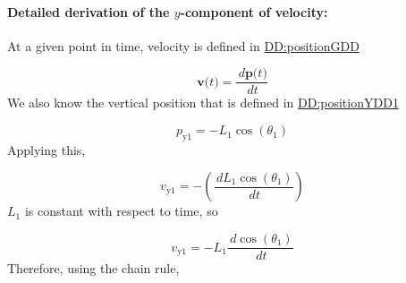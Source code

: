 \documentclass[12pt]{article}
\begin{document}
\paragraph{Detailed derivation of the $y$-component of velocity:}
\label{GD:velocityY1Deriv}
At a given point in time, velocity is defined in \hyperref[DD:positionGDD]{DD:positionGDD}

\begin{displaymath}
\symbf{v}\text{(}t\text{)}=\frac{\,d\symbf{p}\text{(}t\text{)}}{\,dt}
\end{displaymath}
We also know the vertical position that is defined in \hyperref[DD:positionYDD1]{DD:positionYDD1}

\begin{displaymath}
{p_{\text{y}1}}=-{L_{1}} \cos\left({θ_{1}}\right)
\end{displaymath}
Applying this,

\begin{displaymath}
{v_{\text{y}1}}=-\left(\frac{\,d{L_{1}} \cos\left({θ_{1}}\right)}{\,dt}\right)
\end{displaymath}
${L_{1}}$ is constant with respect to time, so

\begin{displaymath}
{v_{\text{y}1}}=-{L_{1}} \frac{\,d\cos\left({θ_{1}}\right)}{\,dt}
\end{displaymath}
Therefore, using the chain rule,
\end{document}
